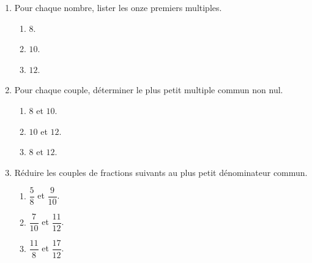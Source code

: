 \begin{exercice*}        
    \begin{enumerate}
        \item Pour chaque nombre, lister les onze premiers multiples.
        \begin{multicols}{3}            
            \begin{enumerate}
                \item $8$.
                \item $10$.
                \item $12$.
            \end{enumerate}
        \end{multicols}
        \item Pour chaque couple, déterminer le plus petit multiple commun non nul.
        \begin{multicols}{3}
            \begin{enumerate}
                \item $8$ et $10$.
                \item $10$ et $12$.
                \item $8$ et $12$.
            \end{enumerate}           
        \end{multicols}
        \item Réduire les couples de fractions suivants au plus petit dénominateur commun.
        \begin{multicols}{3}
            \begin{enumerate}
                \item $\dfrac{5}{8}$ et $\dfrac{9}{10}$.
                \item $\dfrac{7}{10}$ et $\dfrac{11}{12}$.
                \item $\dfrac{11}{8}$ et $\dfrac{17}{12}$.
            \end{enumerate}
        \end{multicols}
    \end{enumerate}
\end{exercice*}
